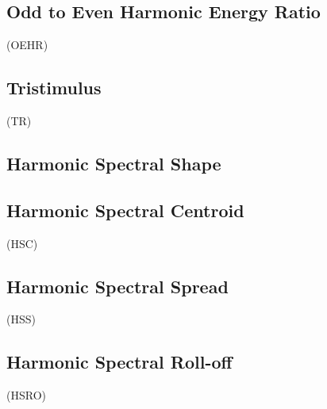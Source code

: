 \subsection{Odd to Even Harmonic Energy Ratio}\label{subsec:oddToEvenHarmonicEnergyRatio}

(OEHR)

\subsection{Tristimulus}\label{subsec:tristimulus}

(TR)

\subsection{Harmonic Spectral Shape}\label{subsec:harmonicSpectralShape}


\subsection{Harmonic Spectral Centroid}\label{subsec:harmonicSpectralCentroid}

(HSC)

\subsection{Harmonic Spectral Spread}\label{subsec:harmonicSpectralSpread}

(HSS)

\subsection{Harmonic Spectral Roll-off}\label{subsec:harmonicSpectralRoll-off}

(HSRO)


